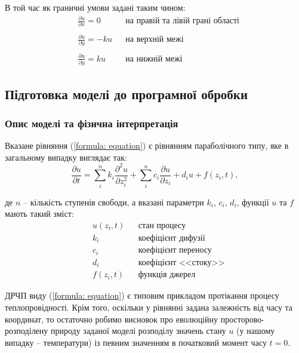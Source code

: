 \documentclass[a4paper,14pt]{extarticle} %
\begin{document}
В той час як граничні умови задані таким чином:
\begin{align}
    &\frac{\partial u}{\partial x}=0 && \text{на правій та лівій грані області} \label{formula: mx} \\ \nonumber \\
    &\frac{\partial u}{\partial y}=-ku && \text{на верхній межі} \\ \nonumber \\
    &\frac{\partial u}{\partial y}=ku && \text{на нижній межі} \label{formula: my}
\end{align}

\subsection*{Підготовка моделі до програмної обробки}

\subsubsection*{Опис моделі та фізична інтерпретація}

Вказане рівняння (\ref{formula: equation}) є рівнянням параболічного типу, яке в загальному випадку виглядає так:
\[ \frac{\partial u}{\partial t} = \sum\limits_i^n k_i\frac{\partial^2 u}{\partial z_i^2} + 
\sum\limits_i^n c_i\frac{\partial u}{\partial z_i} + d_iu +f(z_i,t), \]

де $n$ -- кількість ступенів свободи, а вказані параметри $k_i$, $c_i$, $d_i$, функції $u$ та $f$ мають 
такий зміст:
\begin{align*}
    &u(z_i,t) && \text{стан процесу} \\
    &k_i && \text{коефіцієнт дифузії} \\
    &c_i && \text{коефіцієнт переносу} \\
    &d_i && \text{коефіцієнт <<стоку>>} \\
    &f(z_i,t) && \text{функція джерел}
\end{align*}

ДРЧП виду (\ref{formula: equation}) є типовим прикладом протікання процесу теплопровідності. Крім того, 
оскільки у рівнянні задана залежність від часу та координат, то остаточно робимо висновок про еволюційну 
просторово-розподілену природу заданої моделі розподілу значень стану $u$ (у нашому випадку -- температури) із 
певним значенням в початковий момент часу $t=0$.
\end{document}

